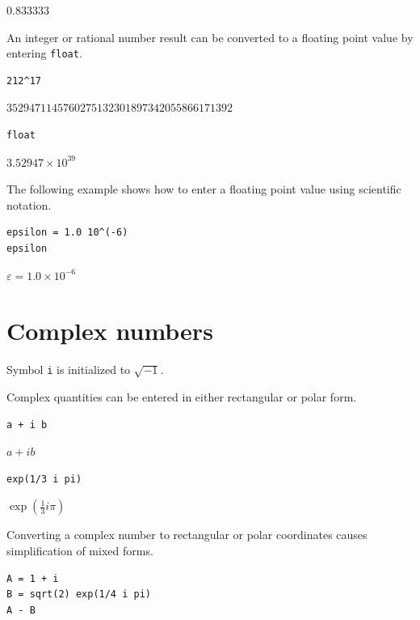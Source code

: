 \documentclass[12pt]{article}
\begin{document}
$\displaystyle 0.833333$

\bigskip

An integer or rational number result can be converted to a floating
point value by entering \verb$float$.

{\color{blue}
\begin{verbatim}
212^17
\end{verbatim}
}

$\displaystyle 3529471145760275132301897342055866171392$

{\color{blue}
\begin{verbatim}
float
\end{verbatim}
}

$\displaystyle 3.52947\times10^{39}$

\bigskip
The following example shows how to enter a floating point value
using scientific notation.

{\color{blue}
\begin{verbatim}
epsilon = 1.0 10^(-6)
epsilon
\end{verbatim}
}

$\displaystyle \varepsilon=1.0\times10^{-6}$

\newpage

\section{Complex numbers}

Symbol \verb$i$ is initialized to $\sqrt{-1}$.

\bigskip

Complex quantities can be entered in either rectangular or polar form.

{\color{blue}
\begin{verbatim}
a + i b
\end{verbatim}
}

$\displaystyle a+ib$

{\color{blue}
\begin{verbatim}
exp(1/3 i pi)
\end{verbatim}
}

$\displaystyle \exp\left(\tfrac{1}{3}i\pi\right)$

\bigskip

Converting a complex number to rectangular or polar coordinates causes
simplification of mixed forms.

{\color{blue}
\begin{verbatim}
A = 1 + i
B = sqrt(2) exp(1/4 i pi)
A - B
\end{verbatim}
}
\end{document}
